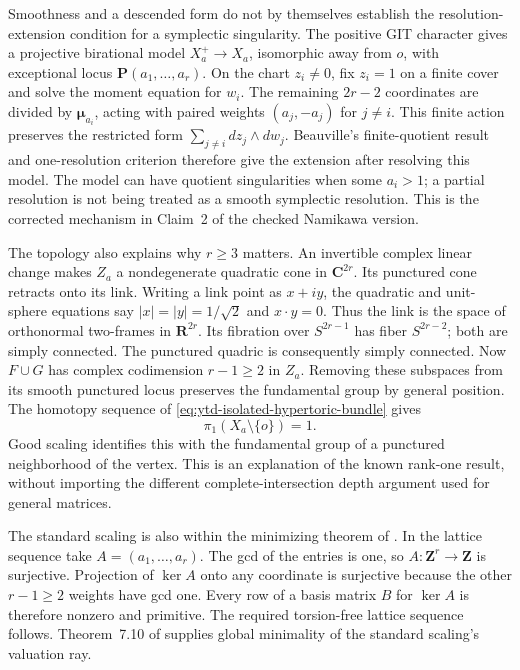 Smoothness and a descended form do not by themselves establish
the resolution-extension condition for a symplectic singularity.
The positive GIT character gives a projective birational model
$X_a^+\to X_a$, isomorphic away from $o$, with exceptional
locus $\mathbf P(a_1,\ldots,a_r)$.
On the chart $z_i\ne0$, fix $z_i=1$ on a finite cover and solve
the moment equation for $w_i$. The remaining $2r-2$ coordinates
are divided by $\boldsymbol\mu_{a_i}$, acting with paired weights
$(a_j,-a_j)$ for $j\ne i$. This finite action preserves the
restricted form $\sum_{j\ne i}dz_j\wedge dw_j$.
Beauville's finite-quotient result and one-resolution criterion
\cite[Proposition~2.4 and paragraph~1.2]{Beauville99SymplecticV1}
therefore give the extension after resolving this model.
The model can have quotient singularities when some $a_i>1$;
a partial resolution is not being treated as a smooth symplectic
resolution. This is the corrected mechanism in Claim~2 of the
checked Namikawa version.

The topology also explains why $r\geq3$ matters. An invertible
complex linear change makes $Z_a$ a nondegenerate quadratic cone
in $\mathbf C^{2r}$. Its punctured cone retracts onto its link.
Writing a link point as $x+iy$, the quadratic and unit-sphere
equations say $|x|=|y|=1/\sqrt2$ and $x\cdot y=0$.
Thus the link is the space of orthonormal two-frames in
$\mathbf R^{2r}$. Its fibration over $S^{2r-1}$ has fiber
$S^{2r-2}$; both are simply connected. The punctured quadric
is consequently simply connected. Now $F\cup G$ has complex
codimension $r-1\geq2$ in $Z_a$. Removing these subspaces
from its smooth punctured locus preserves the fundamental group
by general position. The homotopy sequence of
\eqref{eq:ytd-isolated-hypertoric-bundle} gives
\[
\tag{68.23cf}\label{eq:ytd-isolated-hypertoric-fundamental-group}
 \pi_1(X_a\setminus\{o\})=1.
\]
Good scaling identifies this with the fundamental group of a
punctured neighborhood of the vertex. This is an explanation of
the known rank-one result, without importing the different
complete-intersection depth argument used for general matrices.

The standard scaling is also within the minimizing theorem of
. In the lattice sequence
take $A=(a_1,\ldots,a_r)$. The gcd of the entries is one, so
$A:\mathbf Z^r\to\mathbf Z$ is surjective. Projection of
$\ker A$ onto any coordinate is surjective because the other
$r-1\geq2$ weights have gcd one. Every row of a basis matrix
$B$ for $\ker A$ is therefore nonzero and primitive.
The required torsion-free lattice sequence follows. Theorem~7.10
of \cite{XuZhuang26StableFormsV2} supplies global minimality of
the standard scaling's valuation ray.

